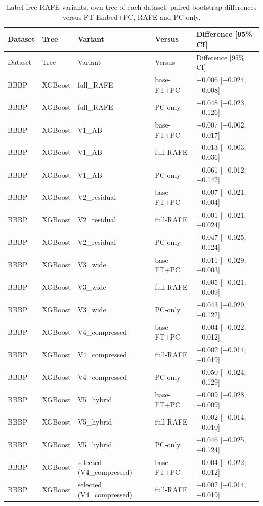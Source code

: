 \begin{longtable}{lllp{2.6cm}p{4.2cm}}
\caption{Label-free RAFE variants, own tree of each dataset: paired bootstrap differences versus FT Embed+PC, RAFE and PC-only.}\label{tab:supp_variants}\\
\toprule
Dataset & Tree & Variant & Versus & Difference [95\% CI] \\
\midrule
\endfirsthead
\toprule
Dataset & Tree & Variant & Versus & Difference [95\% CI] \\
\midrule
\endhead
\bottomrule
\endfoot
BBBP & XGBoost & full\_RAFE & base-FT+PC & $-$0.006 [$-$0.024, +0.008] \\
BBBP & XGBoost & full\_RAFE & PC-only & +0.048 [$-$0.023, +0.126] \\
BBBP & XGBoost & V1\_AB & base-FT+PC & +0.007 [$-$0.002, +0.017] \\
BBBP & XGBoost & V1\_AB & full-RAFE & +0.013 [$-$0.003, +0.036] \\
BBBP & XGBoost & V1\_AB & PC-only & +0.061 [$-$0.012, +0.142] \\
BBBP & XGBoost & V2\_residual & base-FT+PC & $-$0.007 [$-$0.021, +0.004] \\
BBBP & XGBoost & V2\_residual & full-RAFE & $-$0.001 [$-$0.021, +0.024] \\
BBBP & XGBoost & V2\_residual & PC-only & +0.047 [$-$0.025, +0.124] \\
BBBP & XGBoost & V3\_wide & base-FT+PC & $-$0.011 [$-$0.029, +0.003] \\
BBBP & XGBoost & V3\_wide & full-RAFE & $-$0.005 [$-$0.021, +0.009] \\
BBBP & XGBoost & V3\_wide & PC-only & +0.043 [$-$0.029, +0.122] \\
BBBP & XGBoost & V4\_compressed & base-FT+PC & $-$0.004 [$-$0.022, +0.012] \\
BBBP & XGBoost & V4\_compressed & full-RAFE & +0.002 [$-$0.014, +0.019] \\
BBBP & XGBoost & V4\_compressed & PC-only & +0.050 [$-$0.024, +0.129] \\
BBBP & XGBoost & V5\_hybrid & base-FT+PC & $-$0.009 [$-$0.028, +0.009] \\
BBBP & XGBoost & V5\_hybrid & full-RAFE & $-$0.002 [$-$0.014, +0.010] \\
BBBP & XGBoost & V5\_hybrid & PC-only & +0.046 [$-$0.025, +0.124] \\
BBBP & XGBoost & selected (V4\_compressed) & base-FT+PC & $-$0.004 [$-$0.022, +0.012] \\
BBBP & XGBoost & selected (V4\_compressed) & full-RAFE & +0.002 [$-$0.014, +0.019] \\

\end{longtable}
